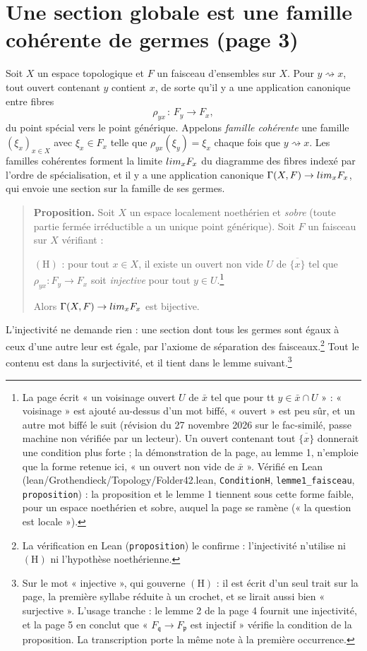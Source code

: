 \documentclass[11pt,a4paper]{article}
\begin{document}
\section*{Une section globale est une famille cohérente de germes (page 3)}

Soit $X$ un espace topologique et $F$ un faisceau d'ensembles sur $X$. Pour
$y \rightsquigarrow x$, tout ouvert contenant $y$ contient $x$, de sorte qu'il
y a une application canonique entre fibres
\[ \rho_{yx} \,:\, F_y \longrightarrow F_x, \]
du point spécial vers le point générique. Appelons \emph{famille cohérente}
une famille $(\xi_x)_{x \in X}$ avec $\xi_x \in F_x$ telle que
$\rho_{yx}(\xi_y) = \xi_x$ chaque fois que $y \rightsquigarrow x$. Les
familles cohérentes forment la limite $\varprojlim_{x} F_x$ du diagramme des
fibres indexé par l'ordre de spécialisation, et il y a une application
canonique $\Gamma(X, F) \to \varprojlim_x F_x$, qui envoie une section sur la
famille de ses germes.

\begin{quote}
\textbf{Proposition.} Soit $X$ un espace localement noethérien et
\emph{sobre} (toute partie fermée irréductible a un unique point
générique). Soit $F$ un faisceau sur $X$ vérifiant :

$(\mathrm{H})$ : pour tout $x \in X$, il existe un ouvert non vide $U$ de
$\overline{\{x\}}$ tel que $\rho_{yx} : F_y \to F_x$ soit \emph{injective}
pour tout $y \in U$.\footnote{La page écrit « un voisinage ouvert $U$ de
$\bar x$ tel que pour tt $y \in \bar x \cap U$ » : « voisinage » est ajouté
au-dessus d'un mot biffé, « ouvert » est peu sûr, et un autre mot biffé le
suit (révision du 27 novembre 2026 sur le fac-similé, passe machine non
vérifiée par un lecteur). Un ouvert contenant tout $\overline{\{x\}}$ donnerait une
condition plus forte ; la démonstration de la page, au lemme 1, n'emploie que
la forme retenue ici, « un ouvert non vide de $\bar x$ ». Vérifié en Lean
(lean/Grothendieck/Topology/Folder42.lean, \texttt{ConditionH},
\texttt{lemme1\_faisceau}, \texttt{proposition}) : la proposition et le
lemme 1 tiennent sous cette forme faible, pour un espace noethérien et sobre,
auquel la page se ramène (« la question est locale »).}

Alors $\Gamma(X, F) \to \varprojlim_x F_x$ est bijective.
\end{quote}

L'injectivité ne demande rien : une section dont tous les germes sont égaux à
ceux d'une autre leur est égale, par l'axiome de séparation des
faisceaux.\footnote{La vérification en Lean (\texttt{proposition}) le
confirme : l'injectivité n'utilise ni $(\mathrm{H})$ ni l'hypothèse
noethérienne.}
Tout le contenu est dans la surjectivité, et il tient dans le lemme
suivant.\footnote{Sur le mot « injective », qui gouverne $(\mathrm{H})$ :
il est écrit d'un seul trait sur la page, la première syllabe réduite à un
crochet, et se lirait aussi bien « surjective ». L'usage tranche :
le lemme 2 de la page 4 fournit une injectivité, et la page 5 en conclut que
« $F_{\mathfrak q} \to F_{\mathfrak p}$ est injectif » vérifie la condition de
la proposition. La transcription porte la même note à la première occurrence.}
\end{document}
